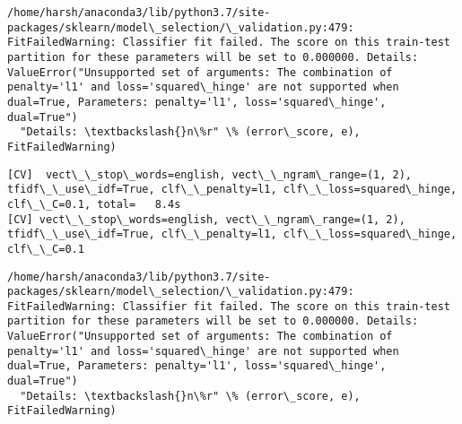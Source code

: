 \documentclass[11pt]{article}
\begin{document}
    \begin{Verbatim}[commandchars=\\\{\}]
/home/harsh/anaconda3/lib/python3.7/site-packages/sklearn/model\_selection/\_validation.py:479: FitFailedWarning: Classifier fit failed. The score on this train-test partition for these parameters will be set to 0.000000. Details: 
ValueError("Unsupported set of arguments: The combination of penalty='l1' and loss='squared\_hinge' are not supported when dual=True, Parameters: penalty='l1', loss='squared\_hinge', dual=True")
  "Details: \textbackslash{}n\%r" \% (error\_score, e), FitFailedWarning)

    \end{Verbatim}

    \begin{Verbatim}[commandchars=\\\{\}]
[CV]  vect\_\_stop\_words=english, vect\_\_ngram\_range=(1, 2), tfidf\_\_use\_idf=True, clf\_\_penalty=l1, clf\_\_loss=squared\_hinge, clf\_\_C=0.1, total=   8.4s
[CV] vect\_\_stop\_words=english, vect\_\_ngram\_range=(1, 2), tfidf\_\_use\_idf=True, clf\_\_penalty=l1, clf\_\_loss=squared\_hinge, clf\_\_C=0.1 

    \end{Verbatim}

    \begin{Verbatim}[commandchars=\\\{\}]
/home/harsh/anaconda3/lib/python3.7/site-packages/sklearn/model\_selection/\_validation.py:479: FitFailedWarning: Classifier fit failed. The score on this train-test partition for these parameters will be set to 0.000000. Details: 
ValueError("Unsupported set of arguments: The combination of penalty='l1' and loss='squared\_hinge' are not supported when dual=True, Parameters: penalty='l1', loss='squared\_hinge', dual=True")
  "Details: \textbackslash{}n\%r" \% (error\_score, e), FitFailedWarning)

    \end{Verbatim}
\end{document}

